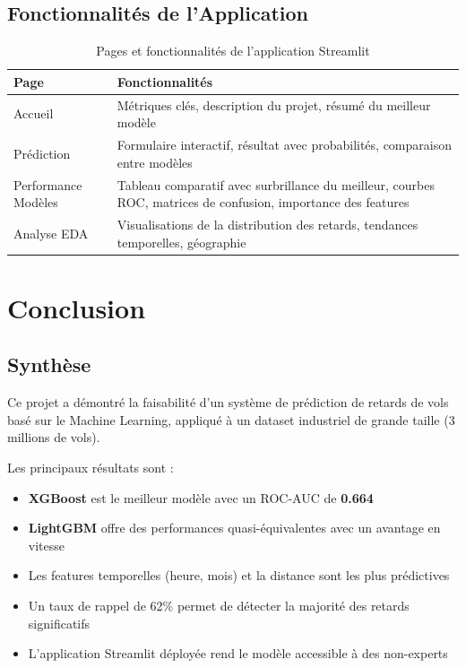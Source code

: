 \documentclass[12pt,a4paper]{article}
\begin{document}
\subsection{Fonctionnalités de l'Application}

\begin{table}[H]
  \centering
  \caption{Pages et fonctionnalités de l'application Streamlit}
  \begin{tabular}{p{3.5cm}p{9cm}}
    \toprule
    \textbf{Page} & \textbf{Fonctionnalités} \\
    \midrule
    Accueil & Métriques clés, description du projet, résumé du meilleur modèle \\
    Prédiction & Formulaire interactif, résultat avec probabilités, comparaison entre modèles \\
    Performance Modèles & Tableau comparatif avec surbrillance du meilleur, courbes ROC, matrices de confusion, importance des features \\
    Analyse EDA & Visualisations de la distribution des retards, tendances temporelles, géographie \\
    \bottomrule
  \end{tabular}
\end{table}

\newpage
\section{Conclusion}

\subsection{Synthèse}

Ce projet a démontré la faisabilité d'un système de prédiction de retards de vols 
basé sur le Machine Learning, appliqué à un dataset industriel de grande taille 
(3 millions de vols). 

Les principaux résultats sont :

\begin{resultbox}
  \begin{itemize}[leftmargin=*, nosep]
    \item \textbf{XGBoost} est le meilleur modèle avec un ROC-AUC de \textbf{0.664}
    \item \textbf{LightGBM} offre des performances quasi-équivalentes avec un avantage en vitesse
    \item Les features temporelles (heure, mois) et la distance sont les plus prédictives
    \item Un taux de rappel de 62\% permet de détecter la majorité des retards significatifs
    \item L'application Streamlit déployée rend le modèle accessible à des non-experts
  \end{itemize}
\end{resultbox}
\end{document}
